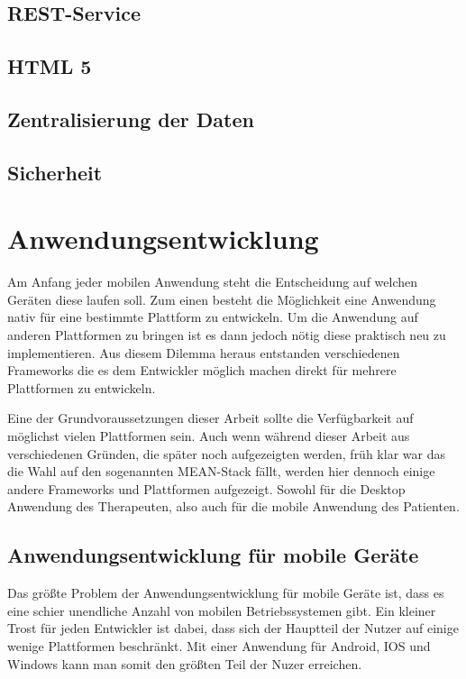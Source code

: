 \subsection{REST-Service}

\subsection{HTML 5}

\subsection{Zentralisierung der Daten}

\subsection{Sicherheit}




\section{Anwendungsentwicklung}
Am Anfang jeder mobilen Anwendung steht die Entscheidung auf welchen Geräten diese laufen soll. Zum einen besteht die Möglichkeit eine Anwendung nativ für eine bestimmte Plattform zu entwickeln. Um die Anwendung auf anderen Plattformen zu bringen ist es dann jedoch nötig diese praktisch neu zu implementieren. Aus diesem Dilemma heraus entstanden verschiedenen Frameworks die es dem Entwickler möglich machen direkt für mehrere Plattformen zu entwickeln.

Eine der Grundvoraussetzungen dieser Arbeit sollte die Verfügbarkeit auf möglichst vielen Plattformen sein. Auch wenn während dieser Arbeit aus verschiedenen Gründen, die später noch aufgezeigten werden, früh klar war das die Wahl auf den sogenannten MEAN-Stack fällt, werden hier dennoch einige andere Frameworks und Plattformen aufgezeigt. Sowohl für die Desktop Anwendung des Therapeuten, also auch für die mobile Anwendung des Patienten.


\subsection{Anwendungsentwicklung für mobile Geräte}
Das größte Problem der Anwendungsentwicklung für mobile Geräte ist, dass es eine schier unendliche Anzahl von mobilen Betriebssystemen gibt. Ein kleiner Trost für jeden Entwickler ist dabei, dass sich der Hauptteil der Nutzer auf einige wenige Plattformen beschränkt. Mit einer Anwendung für Android, IOS und Windows kann man somit den größten Teil der Nuzer erreichen.



